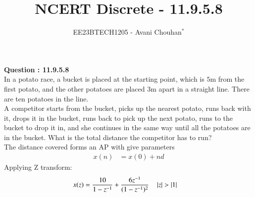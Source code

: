 \documentclass[journal,12pt,twocolumn]{IEEEtran}
\theoremstyle{remark}
\begin{document}

\vspace{3cm}

\title{NCERT Discrete - 11.9.5.8}
\author{EE23BTECH1205 - Avani Chouhan$^{*}$%
}
\maketitle
\newpage
\bigskip

\renewcommand{\thefigure}{\theenumi}
\renewcommand{\thetable}{\theenumi}

\vspace{3cm}
\textbf{Question : 11.9.5.8} \\
In a potato race, a bucket is placed at the starting point, which is $5$m from the first potato, and the other potatoes are placed $3$m apart in a straight line. There are ten potatoes in the line.\\
A competitor starts from the bucket, picks up the nearest potato, runs back with it, drops it in the bucket, runs back to pick up the next potato, runs to the bucket to drop it in, and she continues in the same way until all the potatoes are in the bucket. What is the total distance the competitor has to run?\\

\solution
The distance covered forms an AP with give parameters \\
  
 \begin{align}
 x(n) &= x(0)+nd
 \end{align}
Applying Z transform:
\begin{align}
    x(z) &=\frac{10}{1-z^{-1}} + \frac{6z^{-1}}{(1-z^{-1})^2} 
    \quad \left\vert z\right\vert>\left\vert1\right\vert
\end{align}
\end{document}

